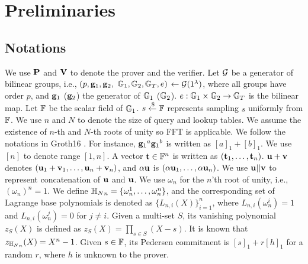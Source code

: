 \section{Preliminaries}
\subsection{Notations}
We use $\mathbf{P}$ and $\mathbf{V}$ to denote
the prover and the verifier.
Let ${\mathcal G}$ be a generator of bilinear groups, i.e.,
$(p, {{\bf{\mathbf g}}}_1, {{\bf{\mathbf g}}}_2,$ ${\mathbb{G}}_1, {\mathbb{G}}_2, {\mathbb{G}}_T, e)$ $\leftarrow {\mathcal G}(1^\lambda)$,
where all groups have order $p$, and
${{\bf{\mathbf g}}}_1$ (${{\bf{\mathbf g}}}_2$) the generator of ${\mathbb{G}}_1$ (${\mathbb{G}}_2$).
$e: {\mathbb{G}}_1 \times {\mathbb{G}}_2 \rightarrow {\mathbb{G}}_T$ is the bilinear
map.
Let $\mathbb{F}$ be the scalar field of ${\mathbb{G}}_1$.
$s \xleftarrow{\$} \mathbb{F}$ represents sampling $s$ uniformly from $\mathbb{F}$.
We use $n$ and $N$ to denote the size of query and lookup tables.
We assume the existence of $n$-th and $N$-th roots of unity 
so FFT is applicable.
We follow the notations in Groth16 \cite{Groth16}. 
For instance, ${{{\bf{\mathbf g}}}_1}^a {{{\bf{\mathbf g}}}_1}^b$ is written
as $[a]_1 + [b]_1$.
We use $[n]$ to denote range $[1,n]$.
A vector
${{\mathbf {t}}} \in \mathbb{F}^n$ is written as
$({{\mathbf {t}}}_1, \ldots, {{\mathbf {t}}}_n)$.
${{\mathbf {u}}} + {{\mathbf {v}}}$ denotes 
$({{\mathbf {u}}}_1 + {{\mathbf {v}}}_1, \ldots, {{\mathbf {u}}}_n + {{\mathbf {v}}}_n)$, 
and $\alpha {{\mathbf {u}}}$ is $(\alpha {{\mathbf {u}}}_1, \ldots, \alpha {{\mathbf {u}}}_n)$.
We use ${{\mathbf {u}}} || {{\mathbf {v}}}$ to represent
concatenation of ${{\mathbf {u}}}$ and ${{\mathbf {u}}}$.
We use $\omega_n$ for the $n$'th root of unity, i.e.,
$(\omega_n)^n = 1$.
We define ${\mathbb{H}_{N}}_n = \{\omega^1_n, \ldots, \omega^n_n\}$,
and the corresponding set of Lagrange base polynomials is denoted as
$\{L_{n,i}(X)\}_{i=1}^n$, where
$L_{n,i}(\omega_{n}^i)=1$ and $L_{n,i}(\omega_{n}^j)=0$ for $j\neq i$.
Given a multi-set $S$, its vanishing polynomial
$z_S(X)$ is defined as $z_S(X) = \prod_{s\in S} (X-s)$.
It is known that $z_{{\mathbb{H}_{N}}_n}(X) = X^n-1$.
Given $s\in \mathbb{F}$, its Pedersen commitment is 
$[s]_1 + r[h]_1$ for a random $r$, where $h$ is unknown to the prover.


